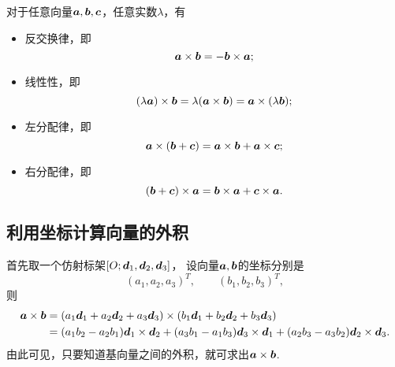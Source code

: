 \begin{theorem}
对于任意向量\(\boldsymbol{a},\boldsymbol{b},\boldsymbol{c}\)，任意实数\(\lambda\)，有
\begin{itemize}
	\item 反交换律，即\begin{equation*}
		\boldsymbol{a}\times\boldsymbol{b}
		= -\boldsymbol{b}\times\boldsymbol{a};
	\end{equation*}
	\item 线性性，即\begin{equation*}
		(\lambda \boldsymbol{a})\times\boldsymbol{b}
		= \lambda(\boldsymbol{a}\times\boldsymbol{b})
		= \boldsymbol{a}\times(\lambda \boldsymbol{b});
	\end{equation*}
	\item 左分配律，即\begin{equation*}
		\boldsymbol{a}\times(\boldsymbol{b}+\boldsymbol{c})
		= \boldsymbol{a}\times\boldsymbol{b}
		+ \boldsymbol{a}\times\boldsymbol{c};
	\end{equation*}
	\item 右分配律，即\begin{equation*}
		(\boldsymbol{b}+\boldsymbol{c})\times\boldsymbol{a}
		= \boldsymbol{b}\times\boldsymbol{a}
		+ \boldsymbol{c}\times\boldsymbol{a}.
	\end{equation*}
\end{itemize}
\end{theorem}

\subsection{利用坐标计算向量的外积}
首先取一个仿射标架\([O;\boldsymbol{d}_1,\boldsymbol{d}_2,\boldsymbol{d}_3]\)，
设向量\(\boldsymbol{a},\boldsymbol{b}\)的坐标分别是\begin{equation*}
	(a_1,a_2,a_3)^T, \qquad
	(b_1,b_2,b_3)^T,
\end{equation*}
则\begin{equation}
\begin{split}
	\boldsymbol{a}\times\boldsymbol{b}
	&= (a_1 \boldsymbol{d}_1 + a_2 \boldsymbol{d}_2 + a_3 \boldsymbol{d}_3)\times(b_1 \boldsymbol{d}_1 + b_2 \boldsymbol{d}_2 + b_3 \boldsymbol{d}_3) \\
	&= (a_1 b_2 - a_2 b_1) \boldsymbol{d}_1\times\boldsymbol{d}_2
	+ (a_3 b_1 - a_1 b_3) \boldsymbol{d}_3\times\boldsymbol{d}_1
	+ (a_2 b_3 - a_3 b_2) \boldsymbol{d}_2\times\boldsymbol{d}_3.
\end{split}
\end{equation}
由此可见，只要知道基向量之间的外积，就可求出\(\boldsymbol{a}\times\boldsymbol{b}\).

